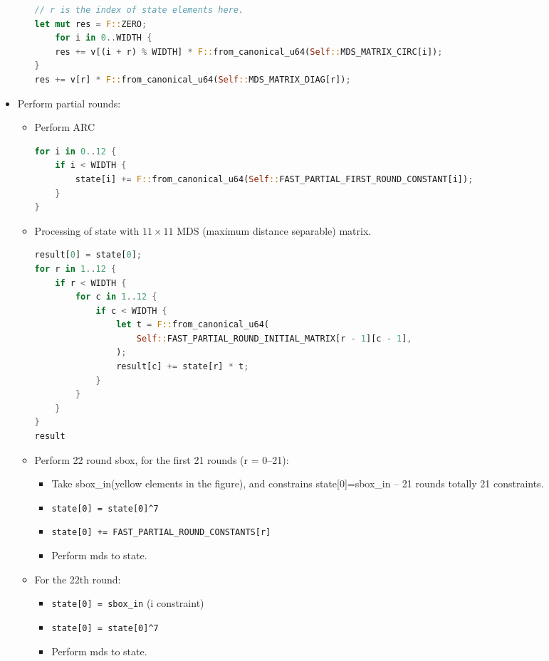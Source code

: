 \begin{itemize}
\begin{itemize}
        \begin{lstlisting}[language=rust]
// r is the index of state elements here.
let mut res = F::ZERO;
    for i in 0..WIDTH {
    res += v[(i + r) % WIDTH] * F::from_canonical_u64(Self::MDS_MATRIX_CIRC[i]);
}
res += v[r] * F::from_canonical_u64(Self::MDS_MATRIX_DIAG[r]);
        \end{lstlisting}
    \end{itemize}
    \item Perform partial rounds:
    \begin{itemize}
        \item Perform ARC
        \begin{lstlisting}[language=rust]
for i in 0..12 {
    if i < WIDTH {
        state[i] += F::from_canonical_u64(Self::FAST_PARTIAL_FIRST_ROUND_CONSTANT[i]);
    }
}
        \end{lstlisting}
        \item Processing of state with $11 \times 11$ MDS (maximum distance separable) matrix.
        \begin{lstlisting}[language=rust]
result[0] = state[0];
for r in 1..12 {
    if r < WIDTH {
        for c in 1..12 {
            if c < WIDTH {
                let t = F::from_canonical_u64(
                    Self::FAST_PARTIAL_ROUND_INITIAL_MATRIX[r - 1][c - 1],
                );
                result[c] += state[r] * t;
            }
        }
    }
}
result
        \end{lstlisting}
        \item Perform 22 round sbox, for the first 21 rounds (r = 0--21):
        \begin{itemize}
            \item Take sbox\_in(yellow elements in the figure), and constrains state[0]=sbox\_in -- 21 rounds totally 21 constraints.
            \item \verb|state[0] = state[0]^7|
            \item \verb|state[0] += FAST_PARTIAL_ROUND_CONSTANTS[r]|
            \item Perform mds to state.
        \end{itemize}
        \item For the 22th round:
        \begin{itemize}
            \item \verb|state[0] = sbox_in| (i constraint)
            \item \verb|state[0] = state[0]^7|
            \item Perform mds to state.

\end{itemize}
\end{itemize}
\end{itemize}
